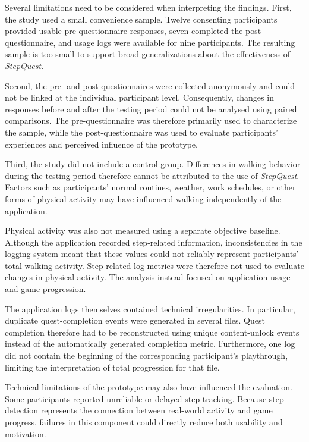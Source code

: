 Several limitations need to be considered when interpreting the findings. First, the study used a small convenience sample. Twelve consenting participants provided usable pre-questionnaire responses, seven completed the post-questionnaire, and usage logs were available for nine participants. The resulting sample is too small to support broad generalizations about the effectiveness of \textit{StepQuest}.

Second, the pre- and post-questionnaires were collected anonymously and could not be linked at the individual participant level. Consequently, changes in responses before and after the testing period could not be analysed using paired comparisons. The pre-questionnaire was therefore primarily used to characterize the sample, while the post-questionnaire was used to evaluate participants' experiences and perceived influence of the prototype.

Third, the study did not include a control group. Differences in walking behavior during the testing period therefore cannot be attributed to the use of \textit{StepQuest}. Factors such as participants' normal routines, weather, work schedules, or other forms of physical activity may have influenced walking independently of the application.

Physical activity was also not measured using a separate objective baseline. Although the application recorded step-related information, inconsistencies in the logging system meant that these values could not reliably represent participants' total walking activity. Step-related log metrics were therefore not used to evaluate changes in physical activity. The analysis instead focused on application usage and game progression.

The application logs themselves contained technical irregularities. In particular, duplicate quest-completion events were generated in several files. Quest completion therefore had to be reconstructed using unique content-unlock events instead of the automatically generated completion metric. Furthermore, one log did not contain the beginning of the corresponding participant's playthrough, limiting the interpretation of total progression for that file.

Technical limitations of the prototype may also have influenced the evaluation. Some participants reported unreliable or delayed step tracking. Because step detection represents the connection between real-world activity and game progress, failures in this component could directly reduce both usability and motivation.

